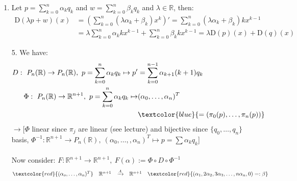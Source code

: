 {\begin{enumerate}
\begin{enumerate}
		Asssume $\exists\alpha_0,\dots,\alpha_n~(m:=\text{max}\{k:\alpha_k\neq 0\})$ not all zero with $\sum_{k=0}^{m}\alpha_kq_k=0$
		\begin{align*}&\Rightarrow~~\sum_{k=0}^{m}\alpha_kq_k=\sum_{k=0}^{m-1}\alpha_kq_k+\alpha_mq_m=0\\
		&\Rightarrow~~\sum_{k=0}^{m}\alpha_kx^k=(-\alpha_m)x^m\\
		&\textcolor{red}{\text{contradiction to 2.}}
		\end{align*}
		\item 
		\begin{align*}
		&\text{span}\{q_0,\dots,q_n\}=P_n(\mathbb{R})~~\text{by definition}\\
		\Rightarrow~~&\text{dim}(P_n(\mathbb{R}))=n+1
		\end{align*}
	\end{enumerate}
	\item 
	Let $p=\sum_{k=0}^{n}\alpha_kq_k$ and $w =\sum_{k=0}^{n}\beta_kq_k$ and $\lambda\in\mathbb{R}$, then:
	\begin{align*}\text{D}(\lambda p+w)(x)&=\left(\sum_{k=0}^{n}(\lambda \alpha_k+\beta_k)x^k\right)'=\sum_{k=0}^{n}(\lambda \alpha_k+\beta_k)kx^{k-1}\\&=\lambda\sum_{k=0}^{n}\alpha_kkx^{k-1}+\sum_{k=0}^{n}\beta_kkx^{k-1}=\lambda \text{D}(p)(x)+\text{D}(q)(x)\end{align*}
	\item[5.] We have:
	\begin{align*}
	D:~P_n(\mathbb{R})\rightarrow P_n(\mathbb{R}),~p=\sum_{k=0}^{n}\alpha_kq_k\mapsto p'&=\sum_{k=0}^{n-1}\alpha_{k+1}(k+1)q_k\\
	\Phi:~P_n(\mathbb{R})\rightarrow\mathbb{R}^{n+1},~p=\sum_{k=0}^{n}\alpha_kq_k\mapsto &(\alpha_0,\dots,\alpha_n)^T\\
	&\textcolor{blue}{=(\pi_0(p),\dots,\pi_n(p))}
	\end{align*}
	$\rightarrow$[$\Phi$ linear since $\pi_j$ are linear (see lecture) and bijective since $\{q_0,\dots,q_n\}$ basis, $\Phi^{-1}:\mathbb{R}^{n+1}\rightarrow P_n(\mathbb{R}),~(\alpha_0,\dots,,\alpha_n)^T\mapsto p=\sum \alpha_kq_k$]\\
	\\
	Now consider: $F:\mathbb{R}^{n+1}\rightarrow\mathbb{R}^{n+1},~F(\alpha):=\Phi\circ D\circ\Phi^{-1}$
	$$
	\begin{matrix}
	\textcolor{red}{(\alpha_o,\dots,\alpha_n)^T}&\mathbb{R}^{n+1}&\xrightarrow{A}&\mathbb{R}^{n+1}&\textcolor{red}{(\alpha_1,2\alpha_2,3\alpha_3,\dots,n\alpha_n,0)=:\beta}\\

\end{matrix}$$
\end{enumerate}}
